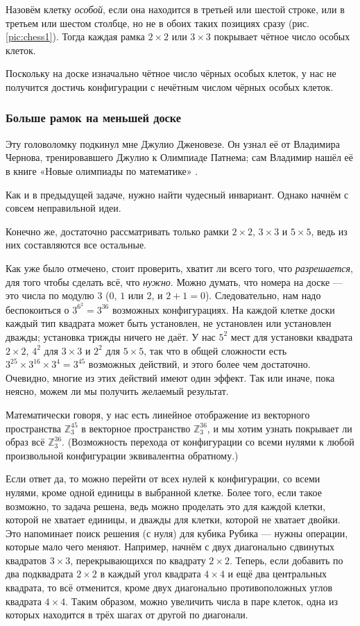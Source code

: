 Назовём клетку \emph{особой}, если она находится в третьей или шестой строке, или в третьем или шестом столбце, но не в обоих таких позициях сразу (рис. \ref{pic:chess1}).
Тогда каждая рамка $2 \times 2$ или $3 \times 3$ покрывает чётное число особых клеток.

Поскольку на доске изначально чётное число чёрных особых клеток, у нас не получится достичь конфигурации с нечётным  числом чёрных особых клеток.

\subsubsection*{Больше рамок на меньшей доске}

Эту головоломку подкинул мне Джулио Дженовезе.
Он узнал её от Владимира Чернова, тренировавшего Джулио к Олимпиаде Патнема; сам Владимир нашёл её в книге «Новые олимпиады по математике» \cite{markova}.

Как и в предыдущей задаче, нужно найти чудесный инвариант.
Однако начнём с совсем неправильной идеи.

Конечно же, достаточно рассматривать только рамки $2 \times 2$, $3 \times 3$ и $5 \times 5$, ведь из них составляются все остальные.

Как уже было отмечено, стоит проверить, хватит ли всего того, что \emph{разрешается}, для того чтобы сделать всё, что \emph{нужно}.
Можно думать, что номера на доске --- это числа по модулю $3$ ($0$, $1$ или $2$, и $2 + 1 = 0$).
Следовательно, нам надо беспокоиться о $3^{6^2} = 3^{36}$ возможных конфигурациях.
На каждой клетке доски каждый тип квадрата может быть установлен, не установлен или установлен дважды; установка трижды ничего не даёт.
У нас $5^2$ мест для установки квадрата $2 \times 2$,
$4^2$ для $3 \times 3$
и $2^2$ для $5 \times 5$, так что в общей сложности есть $3^{25} \times 3^{16} \times 3^4 = 3^{45}$ возможных действий, и этого более чем достаточно.
Очевидно, многие из этих действий имеют один эффект.
Так или иначе, пока неясно, можем ли мы получить желаемый результат.

Математически говоря, у нас есть линейное отображение из векторного пространства $\mathbb{Z}_3^{45}$ в векторное пространство $\mathbb{Z}_3^{36}$, и мы хотим узнать покрывает ли образ всё $\mathbb{Z}_3^{36}$.
(Возможность перехода от конфигурации со всеми нулями к любой произвольной конфигурации эквивалентна обратному.)

Если ответ да, то можно перейти от всех нулей к конфигурации, со всеми нулями, кроме одной единицы в выбранной клетке.
Более того, если такое возможно, то задача решена, ведь можно проделать это для каждой клетки, которой не хватает единицы, и дважды для клетки, которой не хватает двойки.
Это напоминает поиск решения (с нуля) для кубика Рубика --- нужны операции, которые мало чего меняют.
Например, начнём с двух диагонально сдвинутых квадратов $3 \times 3$, перекрывающихся по квадрату $2 \times 2$.
Теперь, если добавить по два подквадрата $2 \times 2$ в каждый угол квадрата $4 \times 4$ и ещё два центральных квадрата, то всё отменится, кроме двух диагонально противоположных углов квадрата $4 \times 4$.
Таким образом, можно увеличить числа в паре клеток, одна из которых находится в трёх шагах от другой по диагонали.

